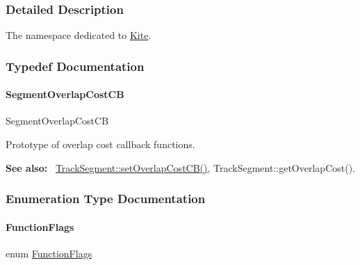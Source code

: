 \subsubsection{Detailed Description}
The namespace dedicated to \mbox{\hyperlink{namespaceKite}{Kite}}. 

\subsubsection{Typedef Documentation}
\mbox{\label{namespaceKite_ac86883c8d5a0f34ab9b4ec6eaaad6c9f}} 
\paragraph{\texorpdfstring{Segment\+Overlap\+Cost\+CB}{SegmentOverlapCostCB}}
{\footnotesize\ttfamily Segment\+Overlap\+Cost\+CB}

Prototype of overlap cost callback functions.

{\bfseries See also\+:}~ \mbox{\hyperlink{classKite_1_1TrackElement_a4648fa47d0870cf743436ff6a6239fd9}{Track\+Segment\+::set\+Overlap\+Cost\+C\+B()}}, Track\+Segment\+::get\+Overlap\+Cost(). 

\subsubsection{Enumeration Type Documentation}
\mbox{\label{namespaceKite_acca8fffa3182dea5f94208f454f14b47}} 
\paragraph{\texorpdfstring{Function\+Flags}{FunctionFlags}}
{\footnotesize\ttfamily enum \mbox{\hyperlink{namespaceKite_acca8fffa3182dea5f94208f454f14b47}{Function\+Flags}}}

